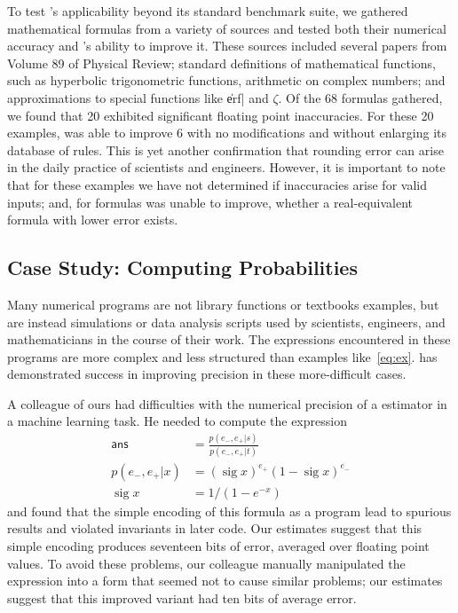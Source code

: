 \documentclass[paper.tex]{subfiles}
\begin{document}
To test \casio's applicability beyond its standard benchmark suite, we
gathered mathematical formulas from a variety of sources and tested
both their numerical accuracy and \casio's ability to improve it.
These sources included several papers from Volume 89 of Physical
Review; standard definitions of mathematical functions, such as
hyperbolic trigonometric functions, arithmetic on complex numbers; and
approximations to special functions like \|erf| and $\zeta$.  Of the
68 formulas gathered, we found that 20 exhibited significant floating
point inaccuracies.  For these 20 examples, \casio was able to improve
6 with no modifications and without enlarging its database of rules.
This is yet another confirmation that rounding error can arise in the
daily practice of scientists and engineers.  However, it is important
to note that for these examples we have not determined if inaccuracies
arise for valid inputs; and, for formulas \casio was unable to
improve, whether a real-equivalent formula with lower error exists.

\subsection{Case Study: Computing Probabilities}

Many numerical programs are not library functions or textbooks
examples, but are instead simulations or data analysis scripts used by
scientists, engineers, and mathematicians in the course of their work.
The expressions encountered in these programs are more complex and
less structured than examples like~\eqref{eq:ex}.  \casio has
demonstrated success in improving precision in these more-difficult
cases.

A colleague of ours had difficulties with the numerical precision of a
estimator in a machine learning task.  He needed to compute the
expression
\begin{align*}
\mathsf{ans} &= \frac{p(e_-,e_+|s)}{p(e_-,e_+|t)} \\
p(e_-, e_+|x) &= (\operatorname{sig} x)^{e_+} (1 - \operatorname{sig} x)^{e_-} \\
\operatorname{sig}x &= 1 / (1 - e^{-x})
\end{align*}
and found that the simple encoding of this formula as a program lead
to spurious results and violated invariants in later code.  Our
estimates suggest that this simple encoding produces seventeen bits of
error, averaged over floating point values.  To avoid these problems,
our colleague manually manipulated the expression into a form that
seemed not to cause similar problems; our estimates suggest that this
improved variant had ten bits of average error.
\end{document}
